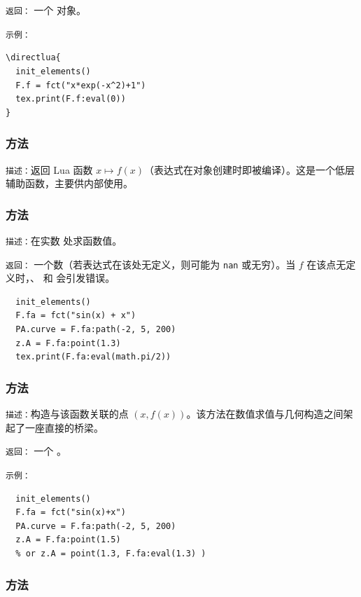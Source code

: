 \medskip
\texttt{返回：} 一个  对象。

\medskip
\texttt{示例：}
\begin{verbatim}
\directlua{
  init_elements()
  F.f = fct("x*exp(-x^2)+1")
  tex.print(F.f:eval(0))
}
\end{verbatim}



\subsubsection{方法 }
\label{ssub:method_fct_compile}

\texttt{描述：}返回 Lua 函数 $x \mapsto f(x)$（表达式在对象创建时即被编译）。这是一个低层辅助函数，主要供内部使用。

\subsubsection{方法 }
\label{ssub:method_fct_value}

\texttt{描述：}在实数  处求函数值。

\medskip
\texttt{返回：} 一个数（若表达式在该处无定义，则可能为 \texttt{nan} 或无穷）。当 $f$ 在该点无定义时，、 和  会引发错误。

\begin{verbatim}
  init_elements()
  F.fa = fct("sin(x) + x")
  PA.curve = F.fa:path(-2, 5, 200)
  z.A = F.fa:point(1.3)
  tex.print(F.fa:eval(math.pi/2))
\end{verbatim}


\subsubsection{方法 }
\label{ssub:method_fct_point}

\texttt{描述：}构造与该函数关联的点 $(x,f(x))$。该方法在数值求值与几何构造之间架起了一座直接的桥梁。

\medskip
\texttt{返回：} 一个 。

\medskip
\texttt{示例：}
\begin{verbatim}
  init_elements()
  F.fa = fct("sin(x)+x")
  PA.curve = F.fa:path(-2, 5, 200)
  z.A = F.fa:point(1.5)
  % or z.A = point(1.3, F.fa:eval(1.3) )
\end{verbatim}

\subsubsection{方法 }
\label{ssub:method_fct_path}

